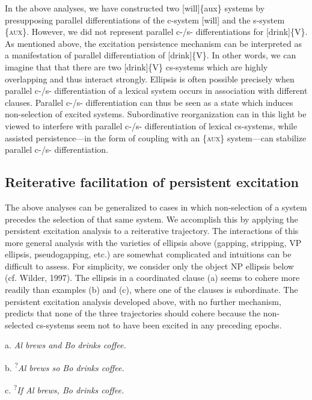   In the above analyses, we have constructed two [will]\{aux\} systems by presupposing parallel differentiations of the c-system [will] and the s-system \{\textsc{aux}\}. However, we did not represent parallel c-/s- differentiations for [drink]\{V\}. As mentioned above, the excitation persistence mechanism can be interpreted as a manifestation of parallel differentiation of [drink]\{V\}. In other words, we can imagine that that there are two [drink]\{V\} cs-systems which are highly overlapping and thus interact strongly. Ellipsis is often possible precisely when parallel c-/s- differentiation of a lexical system occurs in association with different clauses. Parallel c-/s- differentiation can thus be seen as a state which induces non-selection of excited systems. Subordinative reorganization can in this light be viewed to interfere with parallel c-/s- differentiation of lexical cs-systems, while assisted persistence—in the form of coupling with an \{\textsc{aux}\} system—can stabilize parallel c-/s- differentiation.

\subsection{Reiterative facilitation of persistent excitation}

The above analyses can be generalized to cases in which non-selection of a system precedes the selection of that same system. We accomplish this by applying the persistent excitation analysis to a reiterative trajectory. The interactions of this more general analysis with the varieties of ellipsis above (gapping, stripping, VP ellipsis, pseudogapping, etc.) are somewhat complicated and intuitions can be difficult to assess. For simplicity, we consider only the object NP ellipsis below (cf. Wilder, 1997). The ellipsis in a coordinated clause (a) seems to cohere more readily than examples (b) and (c), where one of the clauses is subordinate. The persistent excitation analysis developed above, with no further mechanism, predicts that none of the three trajectories should cohere because the non-selected cs-systems seem not to have been excited in any preceding epochs.

a. \textit{Al brews and Bo drinks coffee.}

b. \textsuperscript{?}\textit{Al brews so Bo drinks coffee.}

c.\textsubscript{} \textsuperscript{?}\textit{If Al brews, Bo drinks coffee.}

